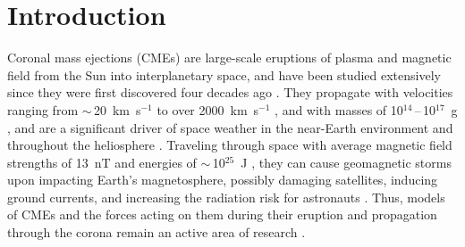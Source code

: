 \documentclass[preprint2]{aastex}
\begin{document}

\section{Introduction}

Coronal mass ejections (CMEs) are large-scale eruptions of plasma and magnetic field from the Sun into interplanetary space, and have been studied extensively since they were first discovered four decades ago \citep{1972BAAS....4R.394T}. They propagate with velocities ranging from $\sim$\,20~km~s$^{-1}$ to over 2000~km~s$^{-1}$ \citep{2004JGRA..10907105Y, 2001JGR...10629219G}, and with masses of 10$^{14}$\,--\,10$^{17}$~g \citep{1985SoPh..100..563J, 1996ApJ...470..629H, 1992ApJ...390L..37G}, and are a significant driver of space weather in the near-Earth environment and throughout the heliosphere \citep{2010heliophysics, 2005AnGeo..23.1033S}. Traveling through space with average magnetic field strengths of 13~nT \citep{2003SoPh..212..425L} and energies of $\sim$\,10$^{25}$~J \citep{2004JGRA..10910104E}, they can cause geomagnetic storms upon impacting Earth's magnetosphere, possibly damaging satellites, inducing ground currents, and increasing the radiation risk for astronauts \citep{2007A&G....48f..11L}. Thus, models of CMEs and the forces acting on them during their eruption and propagation through the corona remain an active area of research \citep[see reviews by][]{2011LRSP....8....1C, 2012LRSP_Webb}.
\end{document}

